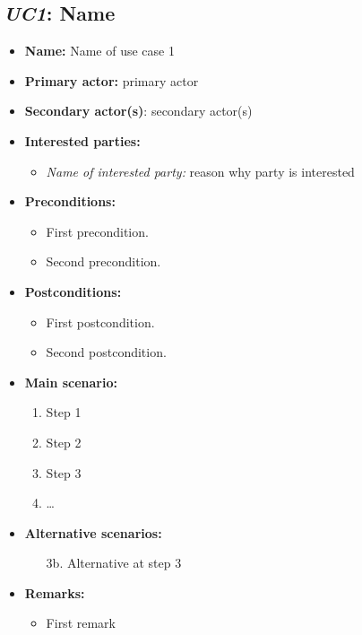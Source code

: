 \documentclass[english]{sareport}
\begin{document}
\subsection{\emph{UC1}: Name}
\begin{itemize}
    \item \textbf{Name:} Name of use case 1
    \item \textbf{Primary actor:} primary actor
    \item \textbf{Secondary actor(s)}: secondary actor(s)
    \item \textbf{Interested parties:}
        \begin{itemize}
            \item \textit{Name of interested party:} reason why party is interested
        \end{itemize}

    \item \textbf{Preconditions:}
        \begin{itemize}
            \item First precondition.
            \item Second precondition.
        \end{itemize}

    \item \textbf{Postconditions:}
        \begin{itemize}
            \item First postcondition.
            \item Second postcondition.
        \end{itemize}

    \item \textbf{Main scenario:}
    \begin{enumerate}
       \item Step 1
       \item Step 2
       \item Step 3
       \item \ldots
    \end{enumerate}

    \item \textbf{Alternative scenarios:}
    \begin{enumerate}
        \item [3b.] Alternative at step 3
    \end{enumerate}

    \item \textbf{Remarks:}
        \begin{itemize}
            \item First remark
        \end{itemize}
\end{itemize}
\end{document}
